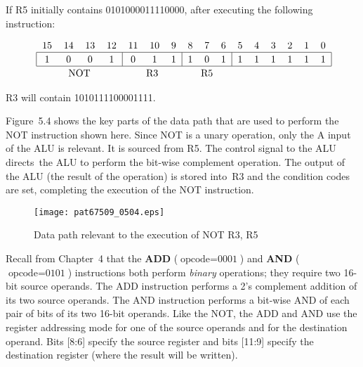 \documentclass{patt}
\begin{document}
If R5 initially contains 0101000011110000, after executing the following 
instruction:

\begin{equation*}
\mbox{\renewcommand{\tabcolsep}{6pt}
\begin{tabular}{cccccccccccccccc}
15 & 14 & 13 & 12 & 11 & 10 & 9 & 8 & 7 & 6 & 5 & 4 & 3 & 2 & 1 & 0\\
\hline
\multicolumn{1}{|c}{\rule{0pt}{10pt}1\rule{0pt}{10pt}}&\multicolumn{1}{c}{0}&
\multicolumn{1}{c}{0}&\multicolumn{1}{c}{1}&
\multicolumn{1}{|c}{0}&\multicolumn{1}{c}{1}&
\multicolumn{1}{c}{1}&\multicolumn{1}{|c}{1}&
\multicolumn{1}{c}{0}&\multicolumn{1}{c}{1}&
\multicolumn{1}{|c}{1}&\multicolumn{1}{c}{1}&
\multicolumn{1}{c}{1}&\multicolumn{1}{c}{1}&
\multicolumn{1}{c}{1}&\multicolumn{1}{c|}{1}\\
\hline
\multicolumn{4}{c}{\rule{0pt}{10pt}NOT\rule{0pt}{10pt}} &\multicolumn{3}{c}{R3} &
\multicolumn{3}{c}{R5}\\
\end{tabular}}
\end{equation*}

R3 will contain 1010111100001111.


Figure~5.4 shows the key parts of the data path that are used to perform
the NOT instruction shown here. Since NOT is a unary operation, only the
A input of the ALU is relevant. It is sourced from R5. The control
signal to the ALU directs~the ALU to perform the bit-wise complement operation.
The output of the ALU (the result of the operation) is stored into~R3 and the
condition codes are set, completing the execution of the NOT instruction.

\begin{figure}
\centerline{\texttt{[image: pat67509\_0504.eps]}}
\caption{Data path relevant to the execution of NOT R3, R5}
\end{figure}

\FloatBarrier
Recall from Chapter~4 that the {\bf ADD} ($\text{opcode}=\text{0001}$) 
and {\bf AND} ($\text{opcode}=\text{0101}$) instructions both 
perform {\em binary}
operations; they require two 16-bit source operands. The ADD
instruction performs a 2's complement addition of its two source
operands. The AND instruction performs a bit-wise AND of each pair
of bits of its two 16-bit operands. Like the NOT, the ADD and AND
use the register addressing mode for one of the source operands
and for the destination operand. Bits [8:6] specify the source
register and bits [11:9] specify the destination register (where the result will be written).
\end{document}
